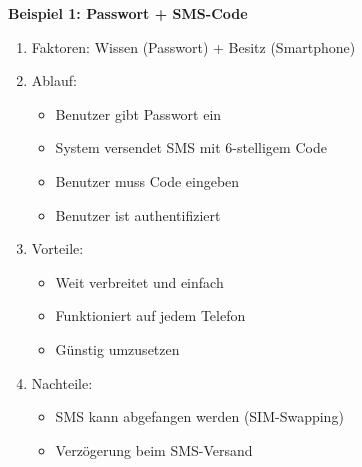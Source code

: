 \documentclass[12pt,a4paper]{article}
\begin{document}
\begin{tcolorbox}[colback=solutionbg, colframe=black!30]
\textbf{Beispiel 1: Passwort + SMS-Code}
\begin{enumerate}[1.]
    \item Faktoren: Wissen (Passwort) + Besitz (Smartphone)
    \item Ablauf:
    \begin{itemize}
        \item Benutzer gibt Passwort ein
        \item System versendet SMS mit 6-stelligem Code
        \item Benutzer muss Code eingeben
        \item Benutzer ist authentifiziert
    \end{itemize}
    \item Vorteile:
    \begin{itemize}
        \item Weit verbreitet und einfach
        \item Funktioniert auf jedem Telefon
        \item Günstig umzusetzen
    \end{itemize}
    \item Nachteile:
    \begin{itemize}
        \item SMS kann abgefangen werden (SIM-Swapping)
        \item Verzögerung beim SMS-Versand
    \end{itemize}
\end{enumerate}

\end{tcolorbox}
\end{document}
